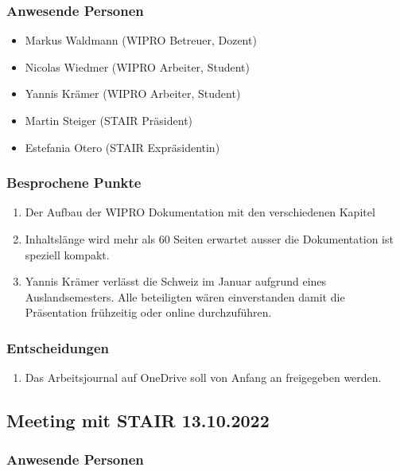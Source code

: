 \documentclass[a4paper, table]{article}
\begin{document}
\subsubsection*{Anwesende Personen}

\begin{itemize}
    \item Markus Waldmann (WIPRO Betreuer, Dozent)
    \item Nicolas Wiedmer (WIPRO Arbeiter, Student)
    \item Yannis Krämer (WIPRO Arbeiter, Student)
    \item Martin Steiger (STAIR Präsident)
    \item Estefania Otero (STAIR Expräsidentin)
\end{itemize}

\subsubsection*{Besprochene Punkte}

\begin{enumerate}
    \item Der Aufbau der WIPRO Dokumentation mit den verschiedenen Kapitel
    \item Inhaltslänge wird mehr als 60 Seiten erwartet ausser die Dokumentation ist speziell kompakt.
    \item Yannis Krämer verlässt die Schweiz im Januar aufgrund eines Auslandsemesters. Alle beteiligten wären einverstanden damit die Präsentation frühzeitig oder online durchzuführen.
\end{enumerate}

\subsubsection*{Entscheidungen}

\begin{enumerate}
    \item Das Arbeitsjournal auf OneDrive soll von Anfang an freigegeben werden.
\end{enumerate}

\newpage
\subsection{Meeting mit STAIR 13.10.2022}

\subsubsection*{Anwesende Personen}
\end{document}
